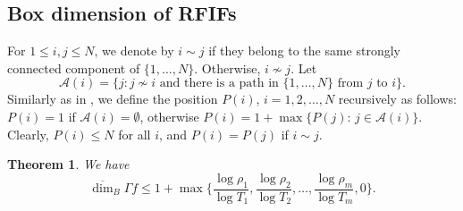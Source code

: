 \documentclass[11pt]{amsart}
\newtheorem{thm}{Theorem}[section]
\theoremstyle{definition}
\theoremstyle{remark}
\numberwithin{equation}{section}
\newcommand{\mA}{{\mathcal A}}
\newcommand{\uprho}{{{\rho}}}
\def\updimB{\overline{\dim}_B}
\begin{document}
\subsection{Box dimension of RFIFs}
For $1 \leq i,j \leq N$, we denote by $i\sim j$ if they belong to the same strongly connected component of $\{1,\ldots,N\}$. Otherwise, $i\not\sim j$.
Let
 $$\mA(i) = \{j : j \not\sim i \mbox{ and there is a path in $\{1,\dots,N\}$ from $j$ to $i$} \}.$$
Similarly as in \cite{RXY21}, we define the position $P(i)$, $i=1,2,\ldots,N$ recursively as follows: $P(i)=1$ if $\mA(i)=\emptyset$, otherwise $P(i)=1+\max\{P(j):\, j\in \mA(i)\}$.
 Clearly, $P(i) \leq N$ for all $i$, and $P(i) = P(j)$ if $i \sim j$.

\begin{thm}\label{thm:box-up-final}
We have
\[
	\updimB \Gamma f \leq 1+\max\Big\{  \frac{\log\uprho_1}{\log T_1},\frac{\log\uprho_2}{\log T_2},\ldots, \frac{\log \uprho_m}{ \log T_m},0 \Big\}.
\]
\end{thm}
\end{document}
